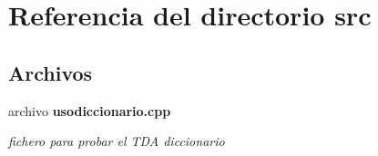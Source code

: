 \section{Referencia del directorio src}
\label{dir_68267d1309a1af8e8297ef4c3efbcdba}
\subsection*{Archivos}
\begin{DoxyCompactItemize}
\item 
archivo {\bf usodiccionario.\+cpp}
\begin{DoxyCompactList}\small\item\em fichero para probar el T\+DA diccionario \end{DoxyCompactList}\end{DoxyCompactItemize}
